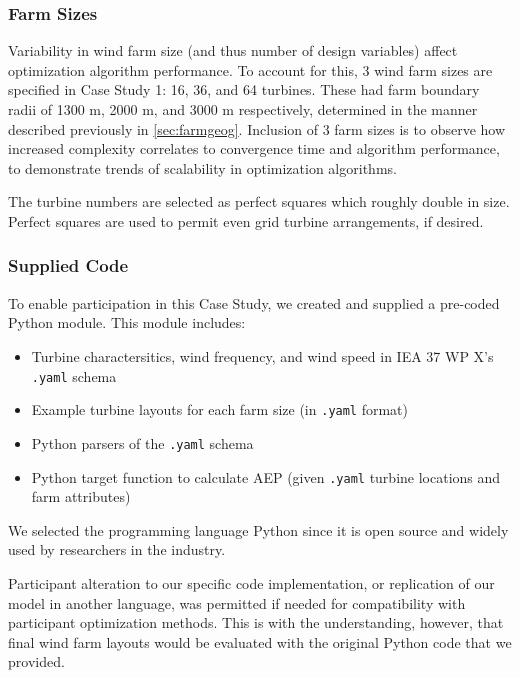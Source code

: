 	\subsubsection{Farm Sizes}
        Variability in wind farm size (and thus number of design variables) affect optimization algorithm performance.
        To account for this, 3 wind farm sizes are specified in Case Study 1: 16, 36, and 64 turbines.
        These had farm boundary radii of 1300 m, 2000 m, and 3000 m respectively, determined in the manner described previously in \cref{sec:farmgeog}.
        Inclusion of 3 farm sizes is to observe how increased complexity correlates to convergence time and algorithm performance, to demonstrate trends of scalability in optimization algorithms.
        
        The turbine numbers are selected as perfect squares which roughly double in size.
        Perfect squares are used to permit even grid turbine arrangements, if desired.
        
    \subsubsection{Supplied Code} \label{sec:code}

        To enable participation in this Case Study, we created and supplied a pre-coded Python module.
        This module includes:
            \begin{itemize}
                \item Turbine charactersitics, wind frequency, and wind speed in IEA 37 WP X's \texttt{.yaml} schema
                \item Example turbine layouts for each farm size (in \texttt{.yaml} format)
                \item Python parsers of the \texttt{.yaml} schema
                \item Python target function to calculate AEP (given \texttt{.yaml} turbine locations and farm attributes)
            \end{itemize}

        We selected the programming language Python since it is open source and widely used by researchers in the industry.

        Participant alteration to our specific code implementation, or replication of our model in another language, was permitted if needed for compatibility with participant optimization methods.
        This is with the understanding, however, that final wind farm layouts would be evaluated with the original Python code that we provided.